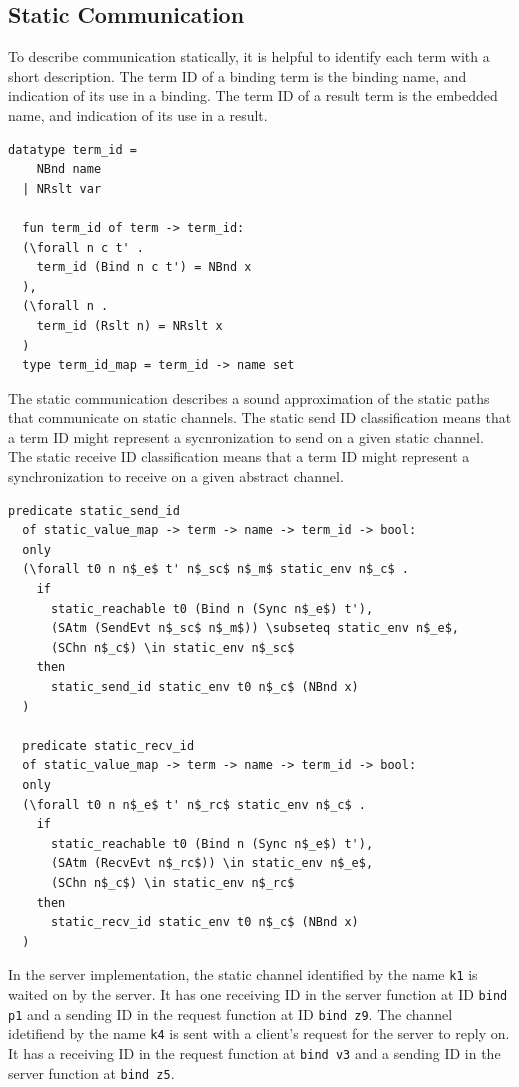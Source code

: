 \documentclass[10pt]{article}
\begin{document}
\subsection{Static Communication}
To describe communication statically, it is helpful to identify each term with a short description.
The term ID of a binding term is the binding name, and indication of its use in a binding.
The term ID of a result term is the embedded name, and indication of its use in a result.

\begin{lstlisting}[language=logic, mathescape]
  datatype term_id =
    NBnd name
  | NRslt var

  fun term_id of term -> term_id:
  (\forall n c t' . 
    term_id (Bind n c t') = NBnd x
  ),
  (\forall n . 
    term_id (Rslt n) = NRslt x
  )
  type term_id_map = term_id -> name set
\end{lstlisting}

The static communication describes a sound approximation of
the static paths that communicate on static channels.
The static send ID classification means that a term ID might represent a
sycnronization to send on a given static channel.
The static receive ID classification means that a term ID might represent a
synchronization to receive on a given abstract channel. 

\begin{lstlisting}[language=logic, mathescape]
  predicate static_send_id
  of static_value_map -> term -> name -> term_id -> bool:
  only
  (\forall t0 n n$_e$ t' n$_sc$ n$_m$ static_env n$_c$ .
    if
      static_reachable t0 (Bind n (Sync n$_e$) t'),
      (SAtm (SendEvt n$_sc$ n$_m$)) \subseteq static_env n$_e$, 
      (SChn n$_c$) \in static_env n$_sc$
    then
      static_send_id static_env t0 n$_c$ (NBnd x)
  )

  predicate static_recv_id
  of static_value_map -> term -> name -> term_id -> bool:
  only
  (\forall t0 n n$_e$ t' n$_rc$ static_env n$_c$ .
    if
      static_reachable t0 (Bind n (Sync n$_e$) t'),
      (SAtm (RecvEvt n$_rc$)) \in static_env n$_e$, 
      (SChn n$_c$) \in static_env n$_rc$ 
    then
      static_recv_id static_env t0 n$_c$ (NBnd x)
  )
\end{lstlisting}


In the server implementation,
the static channel identified by the name \lstinline{k1} is waited on
by the server.  It has one receiving ID in the server function
at ID \lstinline[language=sugar_lang]{bind p1} and a sending ID
in the request function at ID \lstinline[language=sugar_lang]{bind z9}.
The channel idetifiend by the name \lstinline{k4} is sent with a client's request for
the server to reply on. It has a receiving ID in the request function at
\lstinline[language=sugar_lang]{bind v3} and a sending ID in the server function at
\lstinline[language=sugar_lang]{bind z5}.
\end{document}
